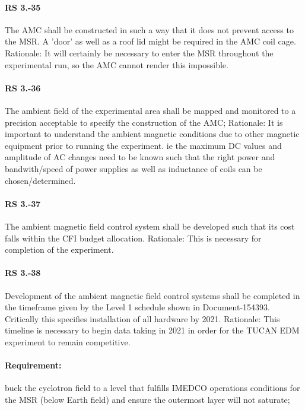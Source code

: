 \paragraph*{RS 3.-35}	The AMC shall be constructed in such a way that it does not prevent access to the MSR. A 'door' as well as a roof lid might be required in the AMC coil cage.
\newline Rationale: 	It will certainly be necessary to enter the MSR throughout the experimental run, so the AMC cannot render this impossible.
\paragraph*{RS 3.-36}	The ambient field of the experimental area shall be mapped and monitored to a precision acceptable to specify the construction of the AMC; 
\newline Rationale: 	It is important to understand the ambient magnetic conditions due to other magnetic equipment prior to running the experiment. ie the maximum DC values and amplitude of AC changes need to be known such that the right power and bandwith/speed of power supplies as well as inductance of coils can be chosen/determined.
\paragraph*{RS 3.-37}	The ambient magnetic field control system shall be developed such that its cost falls within the CFI budget allocation.
\newline Rationale: 	 This is necessary for completion of the experiment.
\paragraph*{RS 3.-38}	Development of the ambient magnetic field control systems shall be completed in the timeframe given by the Level 1 schedule shown in Document-154393. Critically this specifies installation of all hardware by 2021.
\newline Rationale: 	This timeline is necessary to begin data taking in 2021 in order for the TUCAN EDM experiment to remain competitive.

\paragraph*{Requirement:} buck the cyclotron field to a level that fulfills IMEDCO operations conditions
for the MSR (below Earth field) and ensure the outermost layer will not saturate;
